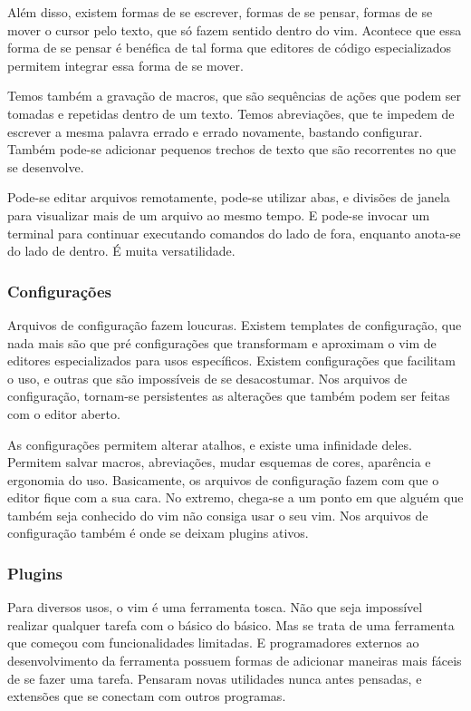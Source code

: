 Além disso, existem formas de se escrever, formas de se pensar, formas de se
mover o cursor pelo texto, que só fazem sentido dentro do vim.
Acontece que essa forma de se pensar é benéfica de tal forma que
editores de código especializados permitem integrar essa forma de se mover.

Temos também a gravação de macros, que são sequências de ações que podem ser tomadas e repetidas dentro de um texto.
Temos abreviações, que te impedem de escrever a mesma palavra errado e errado novamente, bastando configurar.
Também pode-se adicionar pequenos trechos de texto que são recorrentes no que se desenvolve.

Pode-se editar arquivos remotamente, pode-se utilizar abas,
e divisões de janela para visualizar mais de um arquivo ao mesmo tempo.
E pode-se invocar um terminal para continuar executando comandos do lado de fora, enquanto anota-se do lado de dentro.
É muita versatilidade.

\subsubsection{Configurações}
Arquivos de configuração fazem loucuras.
Existem templates de configuração, que nada mais são que pré configurações
que transformam e aproximam o vim de editores especializados para usos específicos.
Existem configurações que facilitam o uso, e outras que são impossíveis de se desacostumar.
Nos arquivos de configuração, tornam-se persistentes as alterações que também podem ser feitas com o editor aberto.

As configurações permitem alterar atalhos, e existe uma infinidade deles.
Permitem salvar macros, abreviações, mudar esquemas de cores, aparência e ergonomia do uso.
Basicamente, os arquivos de configuração fazem com que o editor fique com a sua cara.
No extremo, chega-se a um ponto em que alguém que também seja conhecido do vim não consiga usar o seu vim.
Nos arquivos de configuração também é onde se deixam plugins ativos.

\subsubsection{Plugins}
Para diversos usos, o vim é uma ferramenta tosca.
Não que seja impossível realizar qualquer tarefa com o básico do básico.
Mas se trata de uma ferramenta que começou com funcionalidades limitadas.
E programadores externos ao desenvolvimento da ferramenta possuem formas de
adicionar maneiras mais fáceis de se fazer uma tarefa.
Pensaram novas utilidades nunca antes pensadas, e extensões que se conectam com outros programas.

